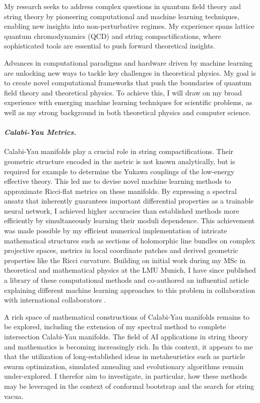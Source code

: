 \documentclass[11pt]{article}
\title{}
\author{}
\date{}
\begin{document}
\thispagestyle{firstpagestyle}

My research seeks to address complex questions in quantum field theory and string theory by pioneering computational and machine learning techniques, enabling new insights into non-perturbative regimes.
My experience spans lattice quantum chromodynamics (QCD) and string compactifications, where sophisticated tools are essential to push forward theoretical insights.

Advances in computational paradigms and hardware driven by machine learning are unlocking new
ways to tackle key challenges in theoretical physics. My goal is to create novel computational
frameworks that push the boundaries of quantum field theory and theoretical physics. To achieve
this, I will draw on my broad experience with emerging machine learning techniques for scientific
problems, as well as my strong background in both theoretical physics and computer science.

\paragraph{\textit{{Calabi-Yau Metrics.}}}
Calabi-Yau manifolds play a crucial role in string compactifications.
Their geometric structure encoded in the metric is not known analytically, but is required for example to determine the Yukawa couplings of the low-energy effective theory.
This led me to devise novel machine learning methods to approximate Ricci-flat metrics on these manifolds.
By expressing a spectral ansatz that inherently guarantees important differential properties as a trainable neural network, I achieved higher accuracies than established methods more efficiently by simultaneously learning their moduli dependence.
This achievement was made possible by my efficient numerical implementation of intricate mathematical structures such as sections of holomorphic line bundles on complex projective spaces, metrics in local coordinate patches and derived geometric properties like the Ricci curvature.
Building on initial work during my MSc in theoretical and mathematical physics at the LMU Munich, I have since published a library of these computational methods \cite{gerdes2023CYJAXPackage} and co-authored an influential article explaining different machine learning approaches to this problem in collaboration with international collaborators \cite{anderson2021ModulidependentCalabiYau}.

\textbf{\color{royalblue}{Future Directions.}}
A rich space of mathematical constructions of Calabi-Yau manifolds remains to be explored, including the extension of my spectral method to complete intersection Calabi-Yau manifolds.
The field of AI applications in string theory and mathematics is becoming increasingly rich.
In this context, it appears to me that the utilization of long-established ideas in metaheuristics such as particle swarm optimization, simulated annealing and evolutionary algorithms remain under-explored.
I therefor aim to investigate, in particular, how these methods may be leveraged in the context of conformal bootstrap and the search for string vacua.
\end{document}
